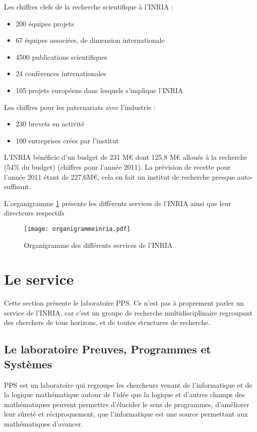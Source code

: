 \documentclass[a4paper, 11pt]{report}
\begin{document}
    Les chiffres clefs de la recherche scientifique à l'INRIA :
    \begin{itemize}
      \item 200 équipes projets
      \item 67 équipes associées, de dimension internationale
      \item 4500 publications scientifiques
      \item 24 conférences internationales
      \item 105 projets européens dans lesquels s'implique l'INRIA
    \end{itemize}

    Les chiffres pour les paternariats avec l'industrie :
    \begin{itemize}
      \item 230 brevets en activité
      \item 100 entreprises crées par l'institut
    \end{itemize}

    L'INRIA bénéficie d'un budget de 231 M\euro{} dont 125,8 M\euro{} alloués à la
    recherche (54\% du budget) (chiffres pour l'année 2011). La prévision
    de recette pour l'année 2011 étant de 227,6M\euro{}, cela en fait un institut
    de recherche presque auto-suffisant.

    L'organigramme \ref{orga} présente les différents services de l'INRIA ainsi
    que leur directeurs respectifs
    \begin{figure}
    \texttt{[image: organigrammeinria.pdf]}
    \caption{Organigramme des différents services de l'INRIA}
    \label{orga}
    \end{figure}

  \section{Le service}
  Cette section présente le laboratoire PPS. Ce n'est pas à proprement parler
  un service de l'INRIA, car c'est un groupe de recherche multidisciplinaire
  regroupant des cherchers de tous horizons, et de toutes structures de
  recherche.
    \subsection{Le laboratoire Preuves, Programmes  et Systèmes}
    PPS est un laboratoire qui regroupe les chercheurs venant de l'informatique
    et de la logique mathématique autour de l'idée que la logique et d'autres
    champs des mathématiques peuvent permettre d'élucider le sens de programmes,
    d'améliorer leur sûreté et réciproquement, que l'informatique est une source
    permettant aux mathématiques d'avancer.
\end{document}

